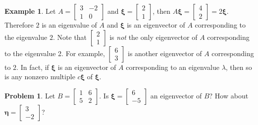 \documentclass[12pt,letterpaper]{book}
\numberwithin{equation}{section}
\theoremstyle{definition}
\newtheorem{problem}[thm]{\textbf{Problem}}
\newtheorem{example}[thm]{\textbf{Example}}
\newcommand{\vxi}{\bm{\xi}}
\newcommand{\veta}{\bm{\eta}}
\begin{document}
\begin{example} Let $A=\left[\begin{array}{rr} 3 & -2 \\ 1 & 0
\end{array}\right]$ and $\vxi=\left[\begin{array}{r} 2 \\ 1 \end{array}\right]$, then $A\vxi=\left[\begin{array}{r}4 \\ 2\end{array}\right]=2\vxi$. Therefore
$2$ is an eigenvalue of $A$ and $\vxi$ is an
eigenvector of $A$ corresponding to the eigenvalue $2$.
Note that $\left[\begin{array}{r} 2 \\
1 \end{array}\right]$ is \textit{not} the only eigenvector of $A$
corresponding to the eigenvalue 2. For example, $\left[\begin{array}{r} 6 \\
3 \end{array}\right]$ is another eigenvector of $A$ corresponding to
$2$. In fact, if $\vxi$ is an eigenvector of $A$ corresponding to an
eigenvalue $\lambda$, then so is any nonzero multiple $c\vxi$
of $\vxi$.
\end{example}

\begin{problem}\label{evalue problem} Let $B=\left[\begin{array}{rr} 1 & 6 \\
5 & 2
\end{array}\right]$. Is $\vxi=\left[\begin{array}{r}  6 \\ -5
\end{array}\right]$ an eigenvector of $B$? How about $\veta=\left[\begin{array}{r}  3 \\
-2 \end{array}\right]$?
\end{problem}
\end{document}
